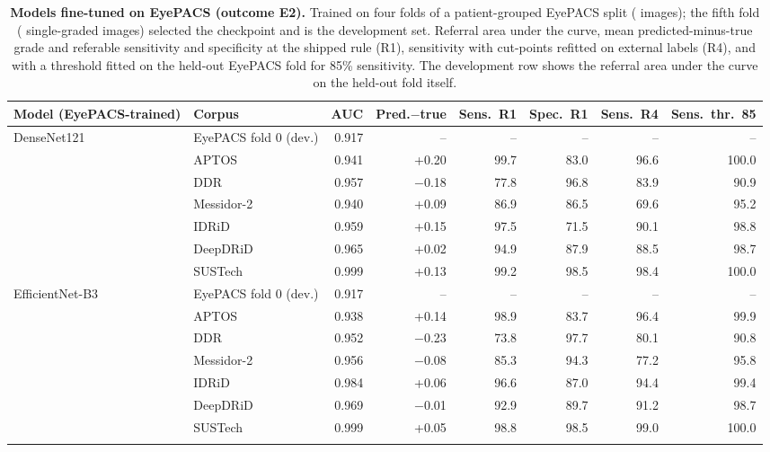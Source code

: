 \begin{table}[h]
\caption{\textbf{Models fine-tuned on EyePACS (outcome E2).} Trained on four folds of a patient-grouped EyePACS split ( images); the fifth fold ( single-graded images) selected the checkpoint and is the development set. Referral area under the curve, mean predicted-minus-true grade and referable sensitivity and specificity at the shipped rule (R1), sensitivity with cut-points refitted on external labels (R4), and with a threshold fitted on the held-out EyePACS fold for 85\% sensitivity. The development row shows the referral area under the curve on the held-out fold itself.}\label{tab:eyepacs}
\centering\scriptsize
\begin{tabular}{@{}llrrrrrr@{}}
\toprule
Model (EyePACS-trained) & Corpus & AUC & Pred.$-$true & Sens.\ R1 & Spec.\ R1 & Sens.\ R4 & Sens.\ thr.\ 85 \\
\midrule
DenseNet121 & EyePACS fold 0 (dev.) & 0.917 & -- & -- & -- & -- & -- \\
 & APTOS & 0.941 & +0.20 & 99.7 & 83.0 & 96.6 & 100.0 \\
 & DDR & 0.957 & $-$0.18 & 77.8 & 96.8 & 83.9 & 90.9 \\
 & Messidor-2 & 0.940 & +0.09 & 86.9 & 86.5 & 69.6 & 95.2 \\
 & IDRiD & 0.959 & +0.15 & 97.5 & 71.5 & 90.1 & 98.8 \\
 & DeepDRiD & 0.965 & +0.02 & 94.9 & 87.9 & 88.5 & 98.7 \\
 & SUSTech & 0.999 & +0.13 & 99.2 & 98.5 & 98.4 & 100.0 \\
\addlinespace
EfficientNet-B3 & EyePACS fold 0 (dev.) & 0.917 & -- & -- & -- & -- & -- \\
 & APTOS & 0.938 & +0.14 & 98.9 & 83.7 & 96.4 & 99.9 \\
 & DDR & 0.952 & $-$0.23 & 73.8 & 97.7 & 80.1 & 90.8 \\
 & Messidor-2 & 0.956 & $-$0.08 & 85.3 & 94.3 & 77.2 & 95.8 \\
 & IDRiD & 0.984 & +0.06 & 96.6 & 87.0 & 94.4 & 99.4 \\
 & DeepDRiD & 0.969 & $-$0.01 & 92.9 & 89.7 & 91.2 & 98.7 \\
 & SUSTech & 0.999 & +0.05 & 98.8 & 98.5 & 99.0 & 100.0 \\
\addlinespace
\bottomrule
\end{tabular}
\end{table}
